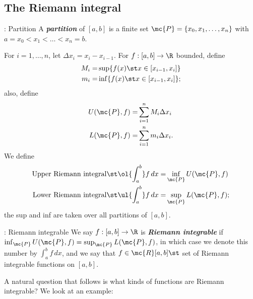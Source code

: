 \subsection{The Riemann integral}
\begin{ndef}{: Partition}
	A \emph{\textbf{partition}} of \([a,b]\) is a finite set \(\mc{P}=\{x_0,x_1,\dots,x_n\}\) with \(a=x_0<x_1<\dots<x_n=b\).
\end{ndef}
For \(i=1,\dots,n\), let \(\Delta x_i=x_i-x_{i-1}\). For \(f:[a,b]\to\R\) bounded, define 
\begin{align*}
	M_i=&\sup\{f(x)\st x\in[x_{i-1},x_i]\}\\
	m_i=&\inf\{f(x)\st x\in[x_{i-1},x_i]\};
\end{align*}
also, define 
\begin{align*}
	U(\mc{P},f)=&\sum_{i=1}^{n} M_i\Delta x_i\\
	L(\mc{P},f)=&\sum_{i=1}^nm_i\Delta x_i.
\end{align*}
We define 
\begin{align*}
	\text{Upper Riemann integral}\st \ol{\int_{a}^b}f \, dx=&\inf_\mc{P} U(\mc{P},f)\\
	\text{Lower Riemann integral}\st \ul{\int_{a}^b}f \, dx=&\sup_\mc{P} L(\mc{P},f);
\end{align*}
the sup and inf are taken over all partitions of \([a,b]\).
\begin{ndef}{: Riemann integrable}
	We say \(f:[a,b]\to\R\) is \emph{\textbf{Riemann integrable}} if \(\inf_\mc{P} U(\mc{P},f)=\sup_\mc{P} L(\mc{P},f)\), in which case we denote this number by \(\displaystyle\int_{a}^b f \, dx\), and we say that \(f\in\mc{R}[a,b]\st\) set of Riemann integrable functions on \([a,b]\).
\end{ndef}
A natural question that follows is what kinds of functions are Riemann integrable? We look at an example:
